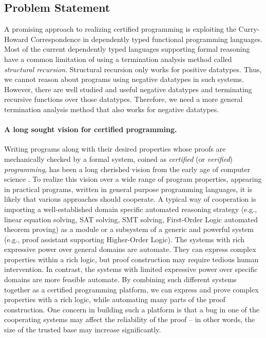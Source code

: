 \documentclass[letterpaper,12pt]{article}
\newcommand{\eg}[0]{e.g., }
\begin{document}
\subsection{Problem Statement} \label{sec:intro:ps}
A promising approach to realizing certified programming is exploiting
the Curry-Howard Correspondence in dependently typed functional programming
languages.
Most of the current dependently typed languages supporting formal reasoning
have a common limitation of using a termination analysis method called
\emph{structural recursion}. Structural recursion only works for
positive datatypes. Thus, we cannot reason about programs using
negative datatypes in such systems.
However, there are well studied and useful negative datatypes and terminating
recursive functions over those datatypes.  Therefore, we need a more general
termination analysis method that also works for negative datatypes.

\paragraph{A long sought vision for certified programming.}
Writing programs along with their desired properties
whose proofs are mechanically checked by a formal system,
coined as \emph{certified} (or \emph{verified}) \emph{programming},
has been a long cherished vision from the early age of computer science
\cite{Dij76,Hoa86}.
To realize this vision over a wide range of program properties, appearing
in practical programs, written in general purpose programming languages,
it is likely that various approaches should cooperate.  A typical way of
cooperation is importing a well-established domain specific automated
reasoning strategy (\eg linear equation solving, SAT solving, SMT solving,
First-Order Logic automated theorem proving) as a module or a subsystem of
a generic and powerful system (\eg proof assistant supporting
Higher-Order Logic).  The systems with rich expressive power over general
domains are automate.  They can express complex properties within
a rich logic, but proof construction may require tedious human intervention.
In contrast, the systems with limited expressive power over specific domains
are more feasible automate.  By combining such different systems together as
a certified programming platform, we can express and prove complex properties
with a rich logic, while automating many parts of the proof construction.
One concern in building such a platform is that a bug in one of the cooperating
systems may affect the reliability of the proof -- in other words, the size of
the trusted base may increase significantly.
\end{document}
